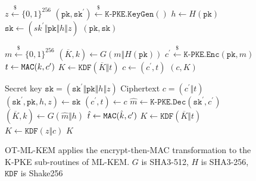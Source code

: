 \documentclass[letterpaper,12pt,titlepage,oneside,final]{book}
\newcommand{\keygen}{\texttt{KeyGen}}
\newcommand{\encrypt}{\texttt{Enc}}
\newcommand{\decrypt}{\texttt{Dec}}
\newcommand{\encap}{\texttt{Encap}}
\newcommand{\decap}{\texttt{Decap}}
\newcommand{\mac}{\texttt{\texttt{MAC}}}
\newcommand{\pk}{\texttt{pk}}
\newcommand{\sk}{\texttt{sk}}
\newcommand{\leftsample}{\stackrel{\$}{\leftarrow}}
\begin{document}
\begin{figure}[htbp]
    \centering

    \begin{minipage}[t]{0.5\textwidth}
        \begin{algorithm}[H]
            \caption*{$\texttt{OT-ML-KEM.}\keygen\texttt{()}$}
            \begin{algorithmic}[1]
                \State $z \leftsample \{0,1\}^{256}$
                \State $(\pk, \sk^\prime) \leftsample \texttt{K-PKE}.\keygen()$
                \State $h \leftarrow H(\pk)$
                \State $\sk \leftarrow (sk^\prime \Vert \pk \Vert h \Vert z)$
                \State \Return $(\pk, \sk)$
            \end{algorithmic}
        \end{algorithm}\vspace{-0.5cm}
        \begin{algorithm}[H]
            \caption*{$\texttt{OT-ML-KEM.}\encap\texttt{(\pk)}$}
            \begin{algorithmic}[1]
                \State $m \leftsample \{0,1\}^{256}$
                \State $(\overline{K}, k) \leftarrow G(m \Vert H(\pk))$
                \State $c^\prime \leftsample \texttt{K-PKE}.\encrypt(\pk, m)$
                \State $t \leftarrow \mac(k, c^\prime)$
                \State $K \leftarrow \texttt{KDF}(\overline{K} \Vert t)$
                \State $c \leftarrow (c^\prime, t)$
                \State \Return $(c, K)$
            \end{algorithmic}
        \end{algorithm}
    \end{minipage}\hfill
    \begin{minipage}[t]{0.49\textwidth}
        \begin{algorithm}[H]
            \caption*{$\texttt{OT-ML-KEM.}\decap\texttt{(\sk, c)}$}
            \begin{algorithmic}[1]
                \Require Secret key $\sk = (\sk^\prime \Vert \pk \Vert h \Vert z)$
                \Require Ciphertext $c = (c^\prime \Vert t)$
                \State $(\sk^\prime, \pk, h, z) \leftarrow \sk$
                \State $(c^\prime, t) \leftarrow c$
                \State $\hat{m} \leftarrow \texttt{K-PKE}.\decrypt(\sk^\prime, c^\prime)$
                \State $(\overline{K}, \hat{k}) \leftarrow G(\hat{m} \Vert h)$
                \State $\hat{t} \leftarrow \mac(\hat{k}, c^\prime)$
                    \State $K \leftarrow \texttt{KDF}(\overline{K} \Vert t)$
                \Else
                    \State $K \leftarrow \texttt{KDF}(z \Vert c)$
                \EndIf
                \State \Return $K$
            \end{algorithmic}
        \end{algorithm}
    \end{minipage}

    \caption{OT-ML-KEM applies the encrypt-then-MAC transformation to the K-PKE sub-routines of ML-KEM. $G$ is SHA3-512, $H$ is SHA3-256, $\texttt{KDF}$ is Shake256}\label{fig:ot-ml-kem-routines}
\end{figure}
\end{document}
